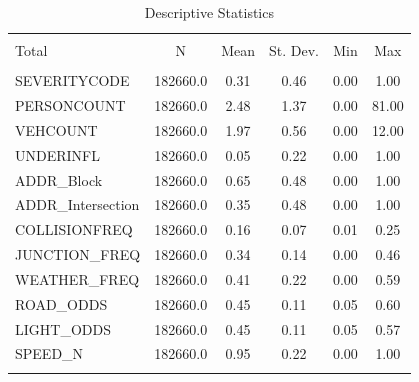 \documentclass[a4paper,12pt]{article}
\begin{document}
\begin{table}[!htbp] \centering \scriptsize
  \caption{Descriptive Statistics}
  \label{}
\begin{tabular}{@{\extracolsep{5pt}}lccccc}
\\[-1.8ex]\hline
\hline \\[-1.8ex]
Total & \multicolumn{1}{c}{N} & \multicolumn{1}{c}{Mean} & \multicolumn{1}{c}{St. Dev.} & \multicolumn{1}{c}{Min} & \multicolumn{1}{c}{Max} \\
\hline \\[-1.8ex]
SEVERITYCODE      &  182660.0 &  0.31 &  0.46 &  0.00 &   1.00 \\
PERSONCOUNT       &  182660.0 &  2.48 &  1.37 &  0.00 &  81.00 \\
VEHCOUNT          &  182660.0 &  1.97 &  0.56 &  0.00 &  12.00 \\
UNDERINFL         &  182660.0 &  0.05 &  0.22 &  0.00 &   1.00 \\
ADDR\_Block        &  182660.0 &  0.65 &  0.48 &  0.00 &   1.00 \\
ADDR\_Intersection &  182660.0 &  0.35 &  0.48 &  0.00 &   1.00 \\
COLLISIONFREQ     &  182660.0 &  0.16 &  0.07 &  0.01 &   0.25 \\
JUNCTION\_FREQ     &  182660.0 &  0.34 &  0.14 &  0.00 &   0.46 \\
WEATHER\_FREQ      &  182660.0 &  0.41 &  0.22 &  0.00 &   0.59 \\
ROAD\_ODDS         &  182660.0 &  0.45 &  0.11 &  0.05 &   0.60 \\
LIGHT\_ODDS        &  182660.0 &  0.45 &  0.11 &  0.05 &   0.57 \\
SPEED\_N           &  182660.0 &  0.95 &  0.22 &  0.00 &   1.00 \\
\hline \\[-1.8ex]
\end{tabular}

	\raggedright\footnotesize {}

\end{table}
\end{document}
